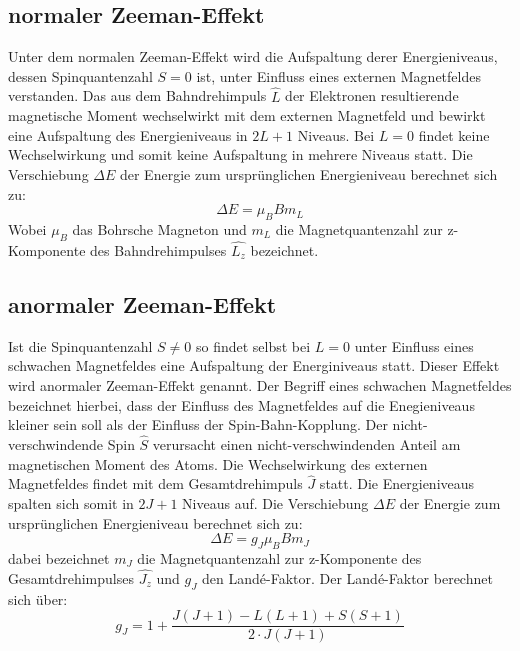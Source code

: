 \subsection{normaler Zeeman-Effekt}
\label{sec:nzeeman}

Unter dem normalen Zeeman-Effekt wird die Aufspaltung derer Energieniveaus, dessen Spinquantenzahl $S = 0$ ist, unter Einfluss eines externen Magnetfeldes verstanden.
Das aus dem Bahndrehimpuls $\hat{L}$ der Elektronen resultierende magnetische Moment wechselwirkt mit dem externen Magnetfeld und bewirkt eine Aufspaltung des Energieniveaus in $2L+1$ Niveaus.  Bei $L = 0$ findet keine Wechselwirkung und somit keine Aufspaltung in mehrere Niveaus statt.
Die Verschiebung $\Delta E$ der Energie zum ursprünglichen Energieniveau berechnet sich zu:
\begin{equation}
\Delta E = \mu_B B m_L
\label{eq:nzeeman}
\end{equation}
Wobei $\mu_B$ das Bohrsche Magneton und $m_L$ die Magnetquantenzahl zur z-Komponente des Bahndrehimpulses $\hat{L_z}$ bezeichnet.\\








\subsection{anormaler Zeeman-Effekt}
\label{sec:anzeeman}

Ist die Spinquantenzahl $S \neq 0$ so findet selbst bei $L = 0$ unter Einfluss eines schwachen Magnetfeldes eine Aufspaltung der Energiniveaus statt.
Dieser Effekt wird anormaler Zeeman-Effekt genannt.
Der Begriff eines schwachen Magnetfeldes bezeichnet hierbei, dass der Einfluss des Magnetfeldes auf die Enegieniveaus kleiner sein soll als der Einfluss der Spin-Bahn-Kopplung.
Der nicht-verschwindende Spin $\hat{S}$ verursacht einen nicht-verschwindenden Anteil am magnetischen Moment des Atoms.
Die Wechselwirkung des externen Magnetfeldes findet mit dem Gesamtdrehimpuls $\hat{J}$ statt.
Die Energieniveaus spalten sich somit in $2J+1$ Niveaus auf.
Die Verschiebung $\Delta E$ der Energie zum ursprünglichen Energieniveau berechnet sich zu:
\begin{equation}
\Delta E = g_J \mu_B B m_J
\label{eq:anzeeman}
\end{equation}
dabei bezeichnet $m_J$ die Magnetquantenzahl zur  z-Komponente des Gesamtdrehimpulses $\hat{J_z}$ und $g_J$ den Landé-Faktor.
Der Landé-Faktor berechnet sich über:
\begin{equation}
g_J = 1+\frac{J(J+1) - L(L+1) + S(S+1)}{2 \cdot J(J+1)}
\label{eq:lande}
\end{equation}



